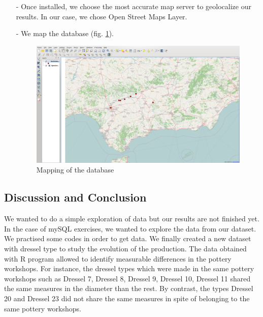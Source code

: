 \documentclass[10pt,a4paper]{article}
\begin{document}
\begin{itemize}
\item[-] Once installed, we choose the most accurate map server to geolocalize our results. In our case, we chose Open Street Maps Layer. 


\newpage

\item[-] We map the database (fig. \ref{gismap}).

\begin{figure}[htp]
  \centering
\includegraphics[scale=0.20]{gismap.png}
\caption{Mapping of the database}
\label{gismap}
\end{figure}

\end{itemize}

\subsection{Discussion and Conclusion}


We wanted to do a simple exploration of data but our results are not finished yet. In the case of mySQL exercises, we wanted to explore the data from our dataset. \\

We practised some codes in order to get data. We finally created a new dataset with dressel type to study the evolution of the production. The data obtained with R program allowed to identify measurable differences in the pottery workshops. For instance, the dressel types which were made in the same pottery workshops such as Dressel 7, Dressel 8, Dressel 9, Dressel 10, Dressel 11 shared the same measures in the diameter than the rest. By contrast, the types Dressel 20 and Dressel 23 did not share the same measures in spite of belonging to the same pottery workshops. \\
\end{document}

